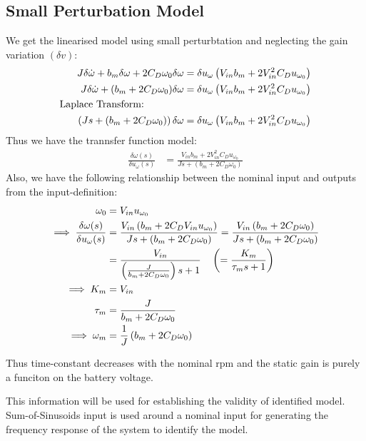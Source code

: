 \subsection{Small Perturbation Model}
We get the linearised model using small perturbtation and neglecting the gain variation $(\delta v)$:
\begin{align*}
    J \delta \dot \omega + b_m \delta \omega + 2 C_D \omega_0 \delta \omega  &= \delta u_\omega \left( V_{in} b_m + 2V_{in}^2 C_D u_{\omega_0} \right)\\
    J \delta \dot \omega + (b_m + 2 C_D \omega_0) \delta \omega  &= \delta u_\omega \left( V_{in} b_m + 2V_{in}^2 C_D u_{\omega_0} \right)\\
    \text{Laplace Transform:} \qquad \qquad &\\
     \left( Js + (b_m + 2 C_D \omega_0) \right) \delta \omega  &= \delta u_\omega \left( V_{in} b_m + 2V_{in}^2 C_D u_{\omega_0} \right)
\end{align*}
Thus we have the trannsfer function model:
\begin{align*}
    \frac{\delta \omega(s)}{\delta u_\omega (s)} &= \frac{V_{in} b_m + 2V_{in}^2 C_D u_{\omega_0}}{Js + (b_m + 2 C_D \omega_0)}
\end{align*}
Also, we have the following relationship between the nominal input and outputs from the input-definition:
\begin{align*}
    \omega_0 &= V_{in} u_{\omega_0}\\
    \implies \frac{\delta \omega(s)}{\delta u_\omega (s)} &= \frac{V_{in} \left( b_m + 2C_D V_{in} u_{\omega_0} \right)}{Js + (b_m + 2 C_D \omega_0)}
    = \frac{V_{in} \left( b_m + 2C_D \omega_0 \right)}{Js + (b_m + 2 C_D \omega_0)}\\
    &= \frac{V_{in}}{ \left( \frac{J}{b_m + 2 C_D \omega_0} \right) s + 1} \quad \left( = \frac{K_m}{\tau_m s + 1} \right)\\
    \implies K_m &= V_{in}\\
    \tau_m &= \frac{J}{b_m + 2 C_D \omega_0}\\
    \implies \omega_m &= \frac{1}{J}\left( b_m + 2 C_D \omega_0 \right)
\end{align*}

Thus time-constant decreases with the nominal rpm and the static gain is purely a funciton on the battery voltage.

This information will be used for establishing the validity of identified model. Sum-of-Sinusoids input is used around a nominal input for generating the frequency response of the system to identify the model.

